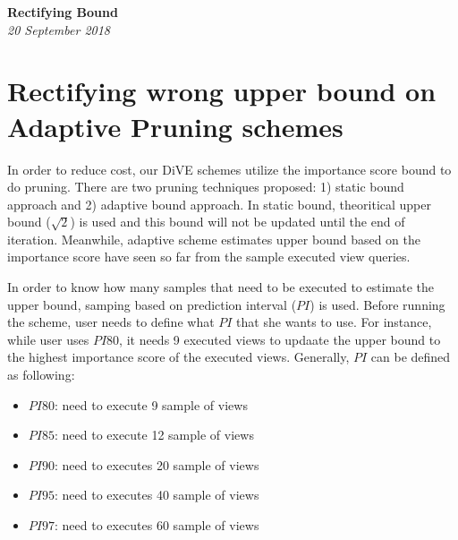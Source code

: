 \documentclass{article}
\begin{document}
\begin{titlepage}
	\begin{center}
		\Large\textbf{Rectifying Bound}\\
		\large\textit{20 September 2018}
	\end{center}
\end{titlepage}














\section{Rectifying wrong upper bound on Adaptive Pruning schemes}


In order to reduce cost, our DiVE schemes utilize the importance score bound to do pruning. There are two pruning techniques proposed: 1) static bound approach and 2) adaptive bound approach. In static bound, theoritical upper bound ($ \sqrt{2} $) is used and this bound will not be updated until the end of iteration. Meanwhile, adaptive scheme estimates upper bound based on the importance score have seen so far from the sample executed view queries.


In order to know how many samples that need to be executed to estimate the upper bound, samping based on prediction interval ($PI$) is used. Before running the scheme, user needs to define what $PI$ that she wants to use. For instance, while user uses $PI80$, it needs 9 executed views to updaate the upper bound to the highest importance score of the executed views. Generally, $PI$ can be defined as following: 


\begin{itemize}[noitemsep]
	\item $ PI80 $: need to execute 9 sample of views
	\item $ PI85 $: need to execute 12 sample of views
	\item $ PI90 $: need to executes 20 sample of views
	\item $ PI95 $: need to executes 40 sample of views
	\item $ PI97 $: need to executes 60 sample of views
\end{itemize}
\end{document}
